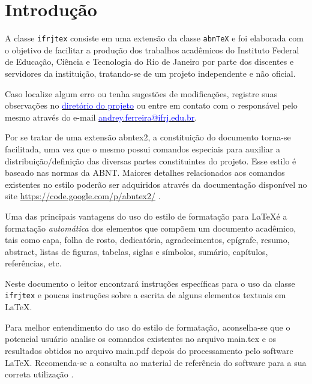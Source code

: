 %
%
\chapter{Introdução}
\label{chap:introducao}

A classe \texttt{ifrjtex} consiste em uma extensão da classe \texttt{abn\TeX} e foi elaborada com o objetivo de facilitar a produção dos trabalhos acadêmicos do Instituto Federal de Educação, Ciência e Tecnologia do Rio de Janeiro por parte dos discentes e servidores da instituição, tratando-se de um projeto independente e não oficial.

Caso localize algum erro ou tenha sugestões de modificações, registre suas observações no \href{https://github.com/andrey-ferreira/ifrjTeX}{\textcolor{blue}{diretório do projeto}} ou entre em contato com o responsável pelo mesmo através do e-mail \href{mailto:andrey.ferreira@ifrj.edu.br}{\textcolor{blue}{andrey.ferreira@ifrj.edu.br}}.

Por se tratar de uma extensão {\ttfamily abntex2},  a constituição do documento torna-se facilitada, uma vez que o mesmo possui comandos especiais para auxiliar a distribuição/definição das diversas partes constituintes do projeto.
Esse estilo é baseado nas normas da ABNT.
Maiores detalhes relacionados aos comandos existentes no estilo poderão ser adquiridos através da documentação disponível no site \href{https://code.google.com/p/abntex2/}{https://code.google.com/p/abntex2/} \cite{abntex2classe}.

Uma das principais vantagens do uso do estilo de formatação para \LaTeX é a formatação \textit{automática} dos elementos que compõem um documento acadêmico, tais como capa, folha de rosto, dedicatória, agradecimentos, epígrafe, resumo, abstract, listas de figuras, tabelas, siglas e símbolos, sumário, capítulos, referências, etc.

Neste documento o leitor encontrará instruções específicas para o uso da classe \texttt{ifrjtex} e poucas instruções sobre a escrita de alguns elementos textuais em \LaTeX. 

Para melhor entendimento do uso do estilo de formatação, aconselha-se que o potencial usuário analise os comandos existentes no arquivo {\ttfamily main.tex} e os resultados obtidos no arquivo {\ttfamily main.pdf} depois do processamento pelo software \LaTeX  \cite{LaTeX2009}.
Recomenda-se a consulta ao material de referência do software para a sua correta utilização \cite{Lamport1986,Buerger1989,Kopka2003,Mittelbach2004}.